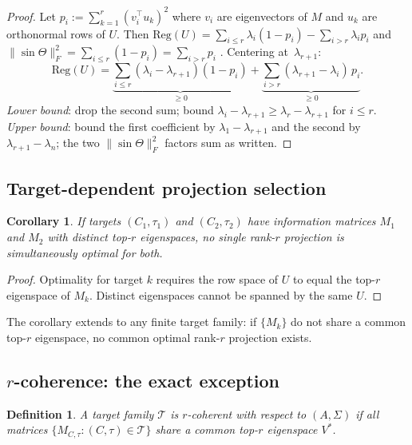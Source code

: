 \documentclass[final,3p,times]{elsarticle}
\newtheorem{corollary}[theorem]{Corollary}
\newtheorem{definition}[theorem]{Definition}
\begin{document}
\begin{proof}
Let $p_i:=\sum_{k=1}^r(v_i^\top u_k)^2$ where $v_i$ are eigenvectors of
$M$ and $u_k$ are orthonormal rows of $U$.
Then $\mathrm{Reg}(U)=\sum_{i\le r}\lambda_i(1-p_i)-\sum_{i>r}\lambda_ip_i$
and $\|\sin\Theta\|_F^2=\sum_{i\le r}(1-p_i)=\sum_{i>r}p_i$
\cite{BjorckGolub1973}.
Centering at~$\lambda_{r+1}$:
\[
  \mathrm{Reg}(U)
  =\underbrace{\textstyle\sum_{i\le r}(\lambda_i-\lambda_{r+1})(1-p_i)}_{\ge 0}
  +\underbrace{\textstyle\sum_{i>r}(\lambda_{r+1}-\lambda_i)\,p_i}_{\ge 0}.
\]
\emph{Lower bound}: drop the second sum; bound $\lambda_i-\lambda_{r+1}
\ge\lambda_r-\lambda_{r+1}$ for $i\le r$.
\emph{Upper bound}: bound the first coefficient by $\lambda_1-\lambda_{r+1}$
and the second by $\lambda_{r+1}-\lambda_n$; the two $\|\sin\Theta\|_F^2$
factors sum as written.
\end{proof}

\subsection{Target-dependent projection selection}

\begin{corollary}\label{cor:noglobal}
If targets $(C_1,\tau_1)$ and $(C_2,\tau_2)$ have information matrices
$M_1$ and $M_2$ with distinct top-$r$ eigenspaces, no single rank-$r$ projection
is simultaneously optimal for both.
\end{corollary}

\begin{proof}
Optimality for target $k$ requires the row space of $U$ to equal the top-$r$
eigenspace of $M_k$.
Distinct eigenspaces cannot be spanned by the same $U$.
\end{proof}

The corollary extends to any finite target family: if $\{M_k\}$ do not share
a common top-$r$ eigenspace, no common optimal rank-$r$ projection exists.

\subsection{\texorpdfstring{$r$}{r}-coherence: the exact exception}

\begin{definition}\label{def:rcoh}
A target family $\mathcal{T}$ is \emph{$r$-coherent} with respect to
$(A,\Sigma)$ if all matrices $\{M_{C,\tau}:(C,\tau)\in\mathcal{T}\}$
share a common top-$r$ eigenspace $V^*$.
\end{definition}
\end{document}
